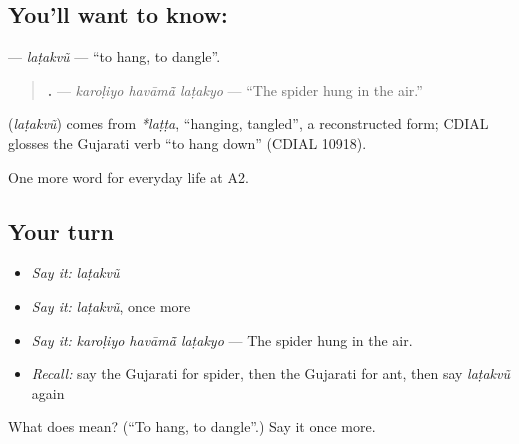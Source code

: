 \subsection*{You'll want to know: }
\textbf{} — \emph{laṭakvũ} — \textquotedblleft{}to hang, to dangle\textquotedblright{}.

\begin{quote}
\textbf{  .} — \emph{karoḷiyo havāmā̃ laṭakyo} — \textquotedblleft{}The spider hung in the air.\textquotedblright{}
\end{quote}

\begin{cousinweb}
\textbf{} (\emph{laṭakvũ}) comes from \emph{*laṭṭa}, \textquotedblleft{}hanging, tangled\textquotedblright{}, a reconstructed form; CDIAL glosses the Gujarati verb \textquotedblleft{}to hang down\textquotedblright{} (CDIAL 10918).
\end{cousinweb}

\begin{grammarlens}[title={What you've built}]
One more word for everyday life at A2.
\end{grammarlens}

\subsection*{Your turn}
\begin{itemize}
\raggedright
  \item \emph{Say it:} \emph{laṭakvũ}
  \item \emph{Say it:} \emph{laṭakvũ}, once more
  \item \emph{Say it:} \emph{karoḷiyo havāmā̃ laṭakyo} — The spider hung in the air.
  \item \emph{Recall:} say the Gujarati for spider, then the Gujarati for ant, then say \emph{laṭakvũ} again
\end{itemize}

\begin{tcolorbox}[breakable,colback=teal!4,colframe=teal!35!black,title={Before you move on}]
What does  mean? (\textquotedblleft{}To hang, to dangle\textquotedblright{}.) Say it once more.
\end{tcolorbox}
